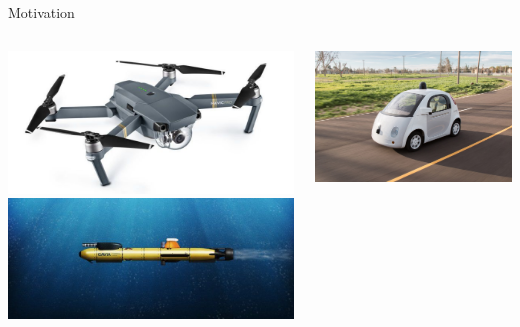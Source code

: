 \documentclass{beamer}
\begin{document}
\begin{frame}{Motivation}
  \begin{columns}[t]
    \begin{column}{0.5\textwidth}
      \centering
      \includegraphics[width=\textwidth]{drone.jpg}
      \includegraphics[width=\textwidth]{underwater.jpg}
    \end{column}
    \begin{column}{0.5\textwidth}
      \centering
      \includegraphics[width=\textwidth]{car.jpg}

\end{column}
\end{columns}
\end{frame}
\end{document}
